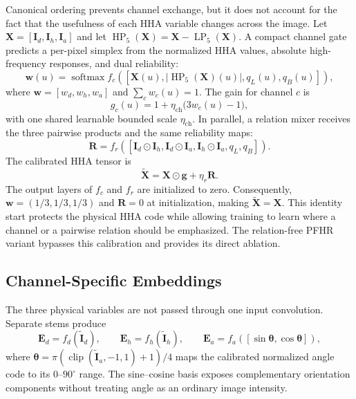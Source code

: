 \documentclass[a4paper,fleqn]{cas-dc}
\begin{document}
Canonical ordering prevents channel exchange, but it does not account for the fact that the usefulness of each HHA variable changes across the image. Let $\mathbf{X}=[\mathbf{I}_{d},\mathbf{I}_{h},\mathbf{I}_{a}]$ and let $\operatorname{HP}_{5}(\mathbf{X})=\mathbf{X}-\operatorname{LP}_{5}(\mathbf{X})$. A compact channel gate predicts a per-pixel simplex from the normalized HHA values, absolute high-frequency responses, and dual reliability:
\begin{equation}
  \mathbf{w}(u)=\operatorname{softmax} f_{c}
  \left([\mathbf{X}(u),|\operatorname{HP}_{5}(\mathbf{X})(u)|,
  q_L(u),q_B(u)]\right),
\end{equation}
where $\mathbf{w}=[w_d,w_h,w_a]$ and $\sum_c w_c(u)=1$. The gain for channel $c$ is
\begin{equation}
  g_c(u)=1+\eta_{\mathrm{ch}}\bigl(3w_c(u)-1\bigr),
\end{equation}
with one shared learnable bounded scale $\eta_{\mathrm{ch}}$. In parallel, a relation mixer receives the three pairwise products and the same reliability maps:
\begin{equation}
  \mathbf{R}=f_{r}([\mathbf{I}_{d}\odot\mathbf{I}_{h},
  \mathbf{I}_{d}\odot\mathbf{I}_{a},
  \mathbf{I}_{h}\odot\mathbf{I}_{a},q_L,q_B]).
\end{equation}
The calibrated HHA tensor is
\begin{equation}
  \widetilde{\mathbf{X}}=
  \mathbf{X}\odot\mathbf{g}+\eta_r\mathbf{R}.
\end{equation}
The output layers of $f_c$ and $f_r$ are initialized to zero. Consequently, $\mathbf{w}=(1/3,1/3,1/3)$ and $\mathbf{R}=0$ at initialization, making $\widetilde{\mathbf{X}}=\mathbf{X}$. This identity start protects the physical HHA code while allowing training to learn where a channel or a pairwise relation should be emphasized. The relation-free PFHR variant bypasses this calibration and provides its direct ablation.

\subsection{Channel-Specific Embeddings}

The three physical variables are not passed through one input convolution. Separate stems produce
\begin{equation}
  \mathbf{E}_{d}=f_d(\widetilde{\mathbf{I}}_{d}),\qquad
  \mathbf{E}_{h}=f_h(\widetilde{\mathbf{I}}_{h}),\qquad
  \mathbf{E}_{a}=f_a([\sin\boldsymbol{\theta},\cos\boldsymbol{\theta}]),
\end{equation}
where $\boldsymbol{\theta}=\pi(\operatorname{clip}(\widetilde{\mathbf{I}}_{a},-1,1)+1)/4$ maps the calibrated normalized angle code to its $0$--$90^{\circ}$ range. The sine--cosine basis exposes complementary orientation components without treating angle as an ordinary image intensity.
\end{document}

